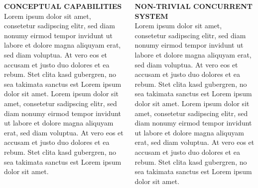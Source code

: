 \documentclass[final,hyperref={pdfpagelabels=true}]{beamer}
\begin{document}
\begin{frame}
  \begin{columns}[t]
    \begin{column}{.45\textwidth}
      \textsf{\textbf{CONCEPTUAL CAPABILITIES}} \\
      \vspace*{\baselineskip}
      {\lmodern
        Lorem ipsum dolor sit amet, consetetur sadipscing elitr, sed diam nonumy eirmod tempor invidunt ut labore et dolore magna aliquyam erat, sed diam voluptua. At vero eos et accusam et justo duo dolores et ea rebum. Stet clita kasd gubergren, no sea takimata sanctus est Lorem ipsum dolor sit amet. Lorem ipsum dolor sit amet, consetetur sadipscing elitr, sed diam nonumy eirmod tempor invidunt ut labore et dolore magna aliquyam erat, sed diam voluptua. At vero eos et accusam et justo duo dolores et ea rebum. Stet clita kasd gubergren, no sea takimata sanctus est Lorem ipsum dolor sit amet.
      }
    \end{column}

    \begin{column}{.45\textwidth}
      \textsf{\textbf{NON-TRIVIAL CONCURRENT SYSTEM}} \\
      \vspace*{\baselineskip}
      {\lmodern
        Lorem ipsum dolor sit amet, consetetur sadipscing elitr, sed diam nonumy eirmod tempor invidunt ut labore et dolore magna aliquyam erat, sed diam voluptua. At vero eos et accusam et justo duo dolores et ea rebum. Stet clita kasd gubergren, no sea takimata sanctus est Lorem ipsum dolor sit amet. Lorem ipsum dolor sit amet, consetetur sadipscing elitr, sed diam nonumy eirmod tempor invidunt ut labore et dolore magna aliquyam erat, sed diam voluptua. At vero eos et accusam et justo duo dolores et ea rebum. Stet clita kasd gubergren, no sea takimata sanctus est Lorem ipsum dolor sit amet.
      }
    \end{column}
  \end{columns}

  \vspace*{2\baselineskip}


\end{frame}
\end{document}
